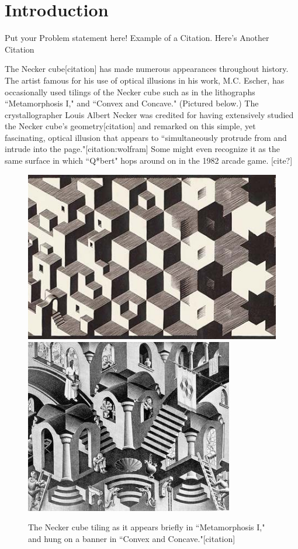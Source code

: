 \documentclass[]{article}
\begin{document}
\newpage
\section{Introduction}

Put your Problem statement here! Example of a Citation\cite[p.219]{Robotics}. Here's Another Citation\cite{Flueck}

The Necker cube[citation] has made numerous appearances throughout history. The artist famous for his use of optical illusions in his work, M.C. Escher, has occasionally used tilings of the Necker cube such as in the lithographs ``Metamorphosis I," and ``Convex and Concave." (Pictured below.) The crystallographer Louis Albert Necker was credited for having extensively studied the Necker cube's geometry[citation] and remarked on this simple, yet fascinating, optical illusion that appears to ``simultaneously protrude from and intrude into the page."[citation:wolfram] Some might even recognize it as the same surface in which ``Q*bert" hops around on in the 1982 arcade game. [cite?]

\begin{figure}[H]
\begin{center}
\includegraphics[scale=0.4]{escher.jpg}
\includegraphics[scale=0.55]{escher2.jpg}
\caption{The Necker cube tiling as it appears briefly in ``Metamorphosis I," and hung on a banner in ``Convex and Concave."[citation]}
\label{fig:Escher}
\end{center}
\end{figure}
\end{document}
